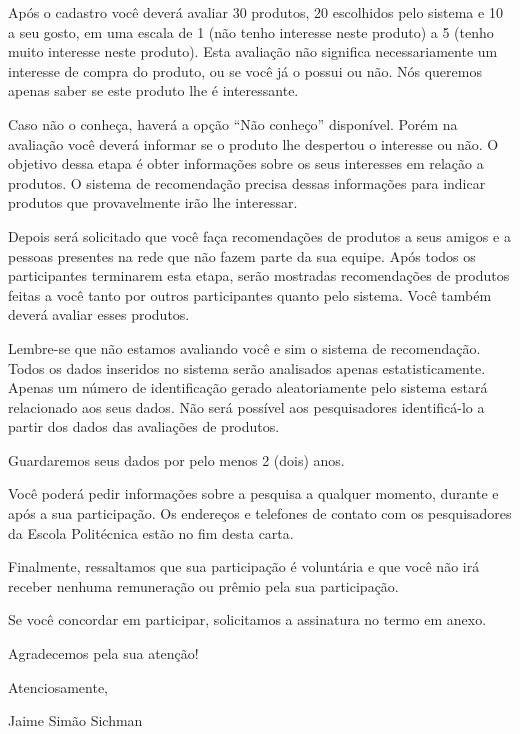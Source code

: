  Após o cadastro você deverá avaliar 30 produtos, 20 escolhidos pelo sistema e 10 a seu gosto, em uma escala de 1 (não tenho interesse neste produto) a 5 (tenho muito interesse neste produto). Esta avaliação não significa necessariamente um interesse de compra do produto, ou se você já o possui ou não. Nós queremos apenas saber se este produto lhe é interessante.

 Caso não o conheça, haverá a opção “Não conheço” disponível. Porém na avaliação você deverá informar se o produto lhe despertou o interesse ou não. O objetivo dessa etapa é obter informações sobre os seus interesses em relação a produtos. O sistema de recomendação precisa dessas informações para indicar produtos que provavelmente irão lhe interessar.

 Depois será solicitado que você faça recomendações de produtos a seus amigos e a pessoas presentes na rede que não fazem parte da sua equipe. Após todos os participantes terminarem esta etapa, serão mostradas recomendações de produtos feitas a você tanto por outros participantes quanto pelo sistema. Você também deverá avaliar esses produtos.

Lembre-se que não estamos avaliando você e sim o sistema de recomendação.  Todos os dados inseridos no sistema serão analisados apenas estatisticamente. Apenas um número de identificação gerado aleatoriamente pelo sistema estará relacionado aos seus dados. Não será possível aos pesquisadores identificá-lo a partir dos dados das avaliações de produtos.

	Guardaremos seus dados por pelo menos 2 (dois) anos.

	Você poderá pedir informações sobre a pesquisa a qualquer momento, durante e após a sua participação. Os endereços e telefones de contato com os pesquisadores da Escola Politécnica estão no fim desta carta.

	Finalmente, ressaltamos que sua participação é voluntária e que você não irá receber nenhuma remuneração ou prêmio pela sua participação.

Se você concordar em participar, solicitamos a assinatura no termo em anexo.

Agradecemos pela sua atenção!

Atenciosamente,

\vspace{0.2in}

Jaime Simão Sichman

\vspace{0.2in}

